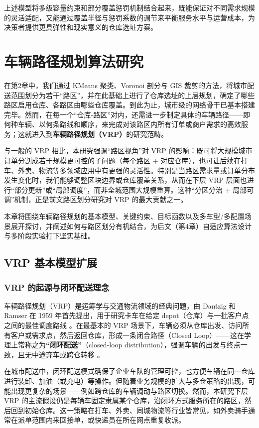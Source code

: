 \documentclass[12pt,a4paper,twoside]{ctexbook}
\begin{document}
上述模型将多级容量约束和部分覆盖惩罚机制结合起来，既能保证对不同需求规模的灵活适配，又能通过覆盖半径与惩罚系数的调节来平衡服务水平与运营成本，为决策者提供更具弹性和现实意义的仓库选址方案。


\chapter{车辆路径规划算法研究}

在第2章中，我们通过 KMeans 聚类、Voronoi 剖分与 GIS 裁剪的方法，将城市配送范围划分为若干“路区”，并在此基础上进行了仓库选址的上层规划，确定了哪些路区启用仓库、各路区由哪些仓库覆盖。到此为止，城市级的网络骨干已基本搭建完毕。然而，在每一个“仓库-路区”对内，还需进一步制定具体的车辆路径——即何种车辆、以何条路线和顺序，来完成对该路区内所有订单或商户需求的高效服务；这就进入到\textbf{车辆路径规划（VRP）}的研究范畴。

与一般的 VRP 相比，本研究强调“路区视角”对 VRP 的影响：既可将大规模城市订单分割成若干规模更可控的子问题（每个路区 + 对应仓库），也可让后续在打车、外卖、物流等多领域应用中有更强的灵活性。特别是当路区需求量或订单分布发生变化时，我们能够调整区块边界或仓库覆盖关系，从而在下层 VRP 层面也进行“部分更新”或“局部调度”，而非全城范围大规模重算。这种“分区分治 + 局部可调”机制，正是前文路区划分研究对 VRP 的最大贡献之一。

本章将围绕车辆路径规划的基本模型、关键约束、目标函数以及多车型/多配置场景展开探讨，并阐述如何与路区划分有机结合，为后文（第4章）自适应算法设计与多阶段实验打下坚实基础。

\section{VRP 基本模型扩展}

\subsection{VRP 的起源与闭环配送理念}
车辆路径规划（VRP）是运筹学与交通物流领域的经典问题，由 Dantzig 和 Ramser 在 1959 年首先提出，用于研究卡车在给定 depot（仓库）与一批客户点之间的最佳调度路线 \cite{dantzig1959truck}。在最基本的 VRP 场景下，车辆必须从仓库出发、访问所有客户或需求点，然后返回仓库，形成一条闭合路径（Closed Loop）——这在学理上常称之为\textbf{“闭环配送”}（closed-loop distribution），强调车辆的出发与终点一致，且无中途弃车或跨仓转移 \cite{crainic2010fleet}。

在城市配送中，闭环配送模式确保了企业车队的管理可控，也方便车辆在同一仓库进行装卸、加油（或充电）等操作。但随着业务规模的扩大与多仓策略的出现，可能出现更复杂的场景——例如跨仓库的车辆调动与路区切换。然而，本研究下层 VRP 的主流假设仍是每辆车固定隶属某个仓库，沿闭环方式服务所在的路区，然后回到初始仓库。这一策略在打车、外卖、同城物流等行业皆常见，如外卖骑手通常在派单范围内来回接单，或快递员在所在网点重复收派。
\end{document}
